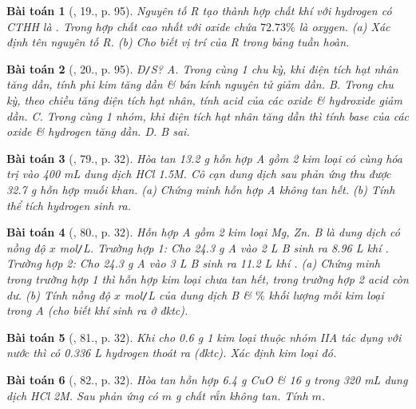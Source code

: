 \documentclass{article}
\newtheorem{baitoan}{Bài toán}
\begin{document}
\begin{baitoan}[\cite{An_Hoa_Hoc_nang_cao_8_9}, 19., p. 95]
	Nguyên tố R tạo thành hợp chất khí với hydrogen có {\rm CTHH} là {\rm{}}. Trong hợp chất cao nhất với oxide chứa $72.73\%$ là oxygen. (a) Xác định tên nguyên tố R. (b) Cho biết vị trí của R trong bảng tuần hoàn.
\end{baitoan}

\begin{baitoan}[\cite{An_Hoa_Hoc_nang_cao_8_9}, 20., p. 95]
	{\rm Đ{\tt/}S?} {\sf A.} Trong cùng 1 chu kỳ, khi điện tích hạt nhân tăng dần, tính phi kim tăng dần \& bán kính nguyên tử giảm dần. {\sf B.} Trong chu kỳ, theo chiều tăng điện tích hạt nhân, tính acid của các oxide \& hydroxide giảm dần. {\sf C.} Trong cùng 1 nhóm, khi điện tích hạt nhân tăng dần thì tính base của các oxide \& hydrogen tăng dần. {\sf D. B} sai.
\end{baitoan}

\begin{baitoan}[\cite{An_400_BT_Hoa_Hoc_9}, 79., p. 32]
	Hòa tan {\rm13.2 g} hỗn hợp A gồm 2 kim loại có cùng hóa trị vào {\rm400 mL} dung dịch {\rm HCl 1.5M}. Cô cạn dung dịch sau phản ứng thu được {\rm32.7 g} hỗn hợp muối khan. (a) Chứng minh hỗn hợp A không tan hết. (b) Tính thể tích hydrogen sinh ra.
\end{baitoan}

\begin{baitoan}[\cite{An_400_BT_Hoa_Hoc_9}, 80., p. 32]
	Hỗn hợp A gồm 2 kim loại {\rm Mg, Zn}. B là dung dịch {\rm{}} có nồng độ $x$ {\rm mol{\tt/}L}. Trường hợp 1: Cho {\rm24.3 g} A vào {\rm 2 L} B sinh ra {\rm8.96 L} khí {\rm{}}. Trường hợp 2: Cho {\rm24.3 g} A vào {\rm 3 L} B sinh ra {\rm11.2 L} khí {\rm{}}. (a) Chứng minh trong trường hợp 1 thì hỗn hợp kim loại chưa tan hết, trong trường hợp 2 acid còn dư. (b) Tính nồng độ $x$ {\rm mol{\tt/}L} của dung dịch B \& $\%$ khối lượng mỗi kim loại trong A (cho biết khí {\rm{}} sinh ra ở đktc).
\end{baitoan}

\begin{baitoan}[\cite{An_400_BT_Hoa_Hoc_9}, 81., p. 32]
	Khi cho {\rm0.6 g} 1 kim loại thuộc nhóm IIA tác dụng với nước thì có {\rm0.336 L} hydrogen thoát ra (đktc). Xác định kim loại đó.
\end{baitoan}

\begin{baitoan}[\cite{An_400_BT_Hoa_Hoc_9}, 82., p. 32]
	Hòa tan hỗn hợp {\rm6.4 g CuO} \& {\rm16 g } trong {\rm320 mL} dung dịch {\rm HCl 2M}. Sau phản ứng có $m$ {\rm g} chất rắn không tan. Tính $m$.
\end{baitoan}
\end{document}
